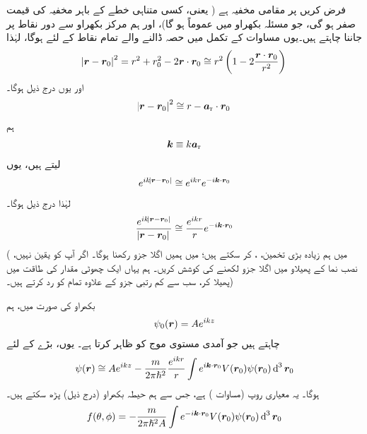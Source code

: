 فرض کریں  پر  مقامی مخفیہ ہے ( یعنی، کسی متناہی خطے کے باہر مخفیہ کی قیمت صفر ہو گی، جو مسئلہ بکھراو میں عموماً ہو گا)، اور ہم مرکز بکھراو سے دور نقاط پر  جاننا چاہتے ہیں۔یوں مساوات  کے تکمل میں حصہ ڈالنے والے تمام نقاط
 کے لئے  ہوگا، لہٰذا
\begin{align}
	\abs{{{\boldsymbol{r}}}-{{\boldsymbol{r}}}_0}^2 = r^2+r_0^2-2{{\boldsymbol{r}}}\cdot {\ensuremath{{\boldsymbol{r}}}}_0 \cong r^2\left(1-2\frac{{{\boldsymbol{r}}}\cdot {\ensuremath{{\boldsymbol{r}}}}_0}{r^2}\right)
\end{align}
اور یوں درج ذیل ہوگا۔
\begin{align}
	\abs{{{\boldsymbol{r}}}-{{\boldsymbol{r}}}_0}^2\cong r-{{\boldsymbol{a}}_{\textup{r}}}\cdot {\ensuremath{{\boldsymbol{r}}}}_0
\end{align}
ہم 
\begin{align}
	{\ensuremath{{\boldsymbol{k}}}}\equiv k{{\boldsymbol{a}}_{\textup{r}}}
\end{align}
لیتے ہیں، یوں
\begin{align}
	e^{ik\abs{{{\boldsymbol{r}}}-{{\boldsymbol{r}}}_0}}\cong e^{ikr}e^{-i{{\boldsymbol{k}}}\cdot {\ensuremath{{\boldsymbol{r}}}}_0}
\end{align}
 لہٰذا درج ذیل ہوگا۔
\begin{align}
	\frac{e^{ik\abs{{{\boldsymbol{r}}}-{{\boldsymbol{r}}}_0}}}{\abs{{{\boldsymbol{r}}}-{{\boldsymbol{r}}}_0}}\cong\frac{e^{ikr}}{r}e^{-i{{\boldsymbol{k}}}\cdot {\ensuremath{{\boldsymbol{r}}}}_0}
\end{align}
( میں ہم زیادہ بڑی تخمین، ، کر سکتے ہیں؛  میں ہمیں اگلا جزو رکھنا ہوگا۔ اگر آپ کو یقین نہیں، نصب نما کے پھیلاو میں اگلا جزو لکھنے کی کوشش کریں۔ ہم یہاں ایک چھوٹی مقدار  کی طاقت میں پھیلا کر، سب سے کم رتبی جزو کے علاوہ تمام کو رد کرتے ہیں۔)

بکھراو کی صورت میں، ہم
\begin{align}
	\psi_0({{\boldsymbol{r}}}) = Ae^{ikz}
\end{align}
 چاہتے ہیں جو آمدی مستوی موج کو ظاہر کرتا ہے۔ یوں، بڑے  کے لئے
\begin{align}
	\psi(\kvec{r})\cong Ae^{ikz}-\frac{m}{2\pi\hslash^2}\frac{e^{ikr}}{r}\int e^{i\kvec{k}\cdot \kvec{r}_0}V(\kvec{r}_0)\psi(\kvec{r}_0)\dif^{\,3}\kvec{r}_0
\end{align}
 ہوگا۔ یہ معیاری روپ (مساوات ) ہے، جس سے ہم حیطہ بکھراو (درج ذیل) پڑھ سکتے ہیں۔
\begin{align}
	f(\theta, \phi) = -\frac{m}{2\pi\hslash^2A}\int e^{-i\kvec{k}\cdot \kvec{r}_0}V(\kvec{r}_0)\psi(\kvec{r}_0)\dif^{\,3}\kvec{r}_0 
\end{align}

